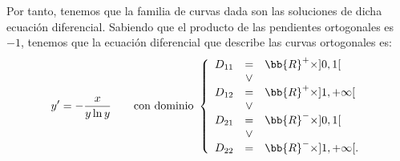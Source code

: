 \begin{ejercicio}
\begin{enumerate}
        Por tanto, tenemos que la familia de curvas dada son las soluciones de dicha ecuación diferencial.
        Sabiendo que el producto de las pendientes ortogonales es $-1$, tenemos que la ecuación diferencial que describe las curvas ortogonales es:
        \begin{equation*}
            y' = -\dfrac{x}{y \ln y} \qquad \text{con dominio } \left\{\begin{array}{rcl}
                D_{11}&=&\bb{R}^+\times ]0,1[\\
                &\lor& \\
                D_{12}&=&\bb{R}^+\times ]1,+\infty[\\
                &\lor& \\
                D_{21}&=&\bb{R}^-\times ]0,1[\\
                &\lor& \\
                D_{22}&=&\bb{R}^-\times ]1,+\infty[.
            \end{array}\right.
        \end{equation*}
    \end{enumerate}
\end{ejercicio}



